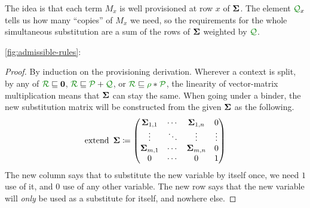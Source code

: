 The idea is that each term $M_x$ is well provisioned at row $x$ of $\mathbf{\Sigma}$.
The element $\resctx Q_x$ tells us how many ``copies'' of $M_x$ we need, so the
requirements for the whole simultaneous substitution are a sum of the rows of
$\mathbf{\Sigma}$ weighted by $\resctx Q$.

\begin{lemma}[Substitution]
  \autoref{fig:admissible-rules}: 
\end{lemma}
\renewcommand{\proofname}{Proof sketch}
\begin{proof}
  By induction on the provisioning derivation.
  Wherever a context is split, by any of $\resctx R \subres \vct 0$,
  $\resctx R \subres \resctx P + \resctx Q$, or
  $\resctx R \subres \rescomment \rho * \resctx P$, the linearity of vector-matrix
  multiplication means that $\mathbf{\Sigma}$ can stay the same.
  When going under a binder, the new substitution matrix will be constructed
  from the given $\mathbf{\Sigma}$ as the following.
  \newcommand*{\mathhuge}[1]{\mathlarger{\mathlarger{\mathlarger{\mathlarger{#1}}}}}
  \[
    \operatorname{extend}~\mathbf{\Sigma} \coloneqq
    \begin{pmatrix}
      \mathbf{\Sigma}_{1,1} & \cdots & \mathbf{\Sigma}_{1,n} & 0 \\
      \vdots & \ddots & \vdots & \vdots \\
      \mathbf{\Sigma}_{m,1} & \cdots & \mathbf{\Sigma}_{m,n} & 0 \\
      0 & \cdots & 0 & 1
    \end{pmatrix}
  \]
  The new column says that to substitute the new variable by itself once, we
  need $1$ use of it, and $0$ use of any other variable.
  The new row says that the new variable will \emph{only} be used as a
  substitute for itself, and nowhere else.
\end{proof}
\renewcommand{\proofname}{Proof}

